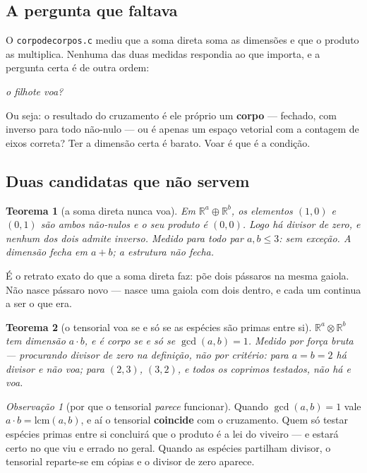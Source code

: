 \documentclass[11pt]{article}
\newcommand{\code}[1]{\texttt{\small #1}}
\newcommand{\R}{\mathbb R}
\theoremstyle{plain}
\newtheorem{teorema}{Teorema}
\theoremstyle{remark}
\newtheorem{obs}{Observação}
\begin{document}
\subsection{A pergunta que faltava}

O \code{corpodecorpos.c} mediu que a soma direta soma as dimensões e que o produto as multiplica.
Nenhuma das duas medidas respondia ao que importa, e a pergunta certa é de outra ordem:

\begin{center}
\emph{o filhote voa?}
\end{center}

Ou seja: o resultado do cruzamento é ele próprio um \textbf{corpo} --- fechado, com inverso para todo
não-nulo --- ou é apenas um espaço vetorial com a contagem de eixos correta? Ter a dimensão certa é
barato. Voar é que é a condição.

\subsection{Duas candidatas que não servem}

\begin{teorema}[a soma direta nunca voa]
Em $\R^a\oplus\R^b$, os elementos $(1,0)$ e $(0,1)$ são ambos não-nulos e o seu produto é $(0,0)$.
Logo há divisor de zero, e nenhum dos dois admite inverso. Medido para todo par $a,b\le3$: sem
exceção. \emph{A dimensão fecha em $a+b$; a estrutura não fecha.}
\end{teorema}

\noindent É o retrato exato do que a soma direta faz: põe dois pássaros na mesma gaiola. Não nasce
pássaro novo --- nasce uma gaiola com dois dentro, e cada um continua a ser o que era.

\begin{teorema}[o tensorial voa se e só se as espécies são primas entre si]
$\R^a\otimes\R^b$ tem dimensão $a\cdot b$, e é corpo \emph{se e só se} $\gcd(a,b)=1$. Medido por
força bruta --- procurando divisor de zero na definição, não por critério: para $a=b=2$ há divisor e
não voa; para $(2,3)$, $(3,2)$, e todos os coprimos testados, não há e voa.
\end{teorema}

\begin{obs}[por que o tensorial \emph{parece} funcionar]
Quando $\gcd(a,b)=1$ vale $a\cdot b=\mathrm{lcm}(a,b)$, e aí o tensorial \textbf{coincide} com o
cruzamento. Quem só testar espécies primas entre si concluirá que o produto é a lei do viveiro --- e
estará certo no que viu e errado no geral. Quando as espécies partilham divisor, o tensorial
reparte-se em cópias e o divisor de zero aparece.
\end{obs}
\end{document}
